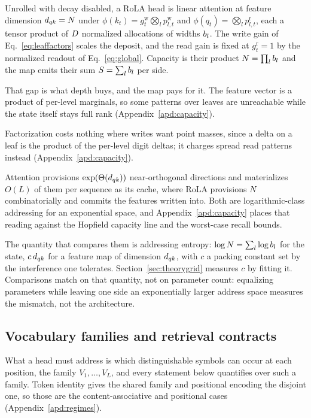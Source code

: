 \begin{proposition}
\label{prop:identity}
Unrolled with decay disabled, a RoLA head is linear attention at feature dimension $d_{qk} = N$ under $\phi(k_t) = g^{\mathrm{w}}_t \bigotimes_l p^{\mathrm{w}}_{l,t}$ and $\phi(q_t) = \bigotimes_l p^{\mathrm{r}}_{l,t}$, each a tensor product of $D$ normalized allocations of widths $b_l$. The write gain of Eq.~\eqref{eq:leaffactors} scales the deposit, and the read gain is fixed at $g^{\mathrm{r}}_t = 1$ by the normalized readout of Eq.~\eqref{eq:global}. Capacity is their product $N = \prod_l b_l$ and the map emits their sum $S = \sum_l b_l$ per side.
\end{proposition}

That gap is what depth buys, and the map pays for it. The feature vector is a product of per-level marginals, so some patterns over leaves are unreachable while the state itself stays full rank (Appendix~\ref{apd:capacity}).

Factorization costs nothing where writes want point masses, since a delta on a leaf is the product of the per-level digit deltas; it charges spread read patterns instead (Appendix~\ref{apd:capacity}).

Attention provisions $\exp(\Theta(d_{qk}))$ near-orthogonal directions and materializes $O(L)$ of them per sequence as its cache, where RoLA provisions $N$ combinatorially and commits the features written into. Both are logarithmic-class addressing for an exponential space, and Appendix~\ref{apd:capacity} places that reading against the Hopfield capacity line and the worst-case recall bounds.


The quantity that compares them is addressing entropy: $\log N = \sum_l \log b_l$ for the state, $c\,d_{qk}$ for a feature map of dimension $d_{qk}$, with $c$ a packing constant set by the interference one tolerates. Section~\ref{sec:theorygrid} measures $c$ by fitting it. Comparisons match on that quantity, not on parameter count: equalizing parameters while leaving one side an exponentially larger address space measures the mismatch, not the architecture.

\subsection{Vocabulary families and retrieval contracts}
\label{sec:families}

What a head must address is which distinguishable symbols can occur at each position, the family $V_1,\dots,V_L$, and every statement below quantifies over such a family. Token identity gives the shared family and positional encoding the disjoint one, so those are the content-associative and positional cases (Appendix~\ref{apd:regimes}).

